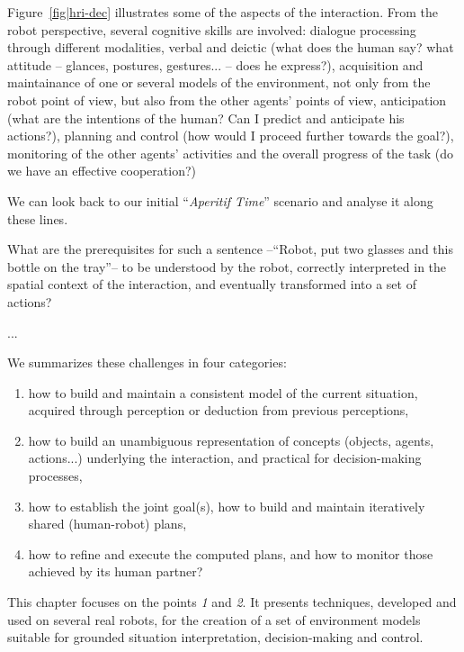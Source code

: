 \documentclass{svmult}
\begin{document}
Figure~\ref{fig|hri-dec} illustrates some of the aspects of the interaction.
From the robot perspective, several cognitive skills are involved: dialogue
processing through different modalities, verbal and deictic (what does the
human say? what attitude -- glances, postures, gestures... -- does he
express?), acquisition and maintainance of one or several models of the
environment, not only from the robot point of view, but also from the other
agents' points of view, anticipation (what are the intentions of the human? Can
I predict and anticipate his actions?), planning and control (how would I
proceed further towards the goal?), monitoring of the other agents' activities
and the overall progress of the task (do we have an effective cooperation?)

We can look back to our initial ``\emph{Aperitif Time}'' scenario and analyse
it along these lines.

What are the prerequisites for such a sentence --``Robot, put two glasses and
this bottle on the tray''-- to be understood by the robot, correctly
interpreted in the spatial context of the interaction, and eventually
transformed into a set of actions?


...

We summarizes these challenges in four categories:

\begin{enumerate}

	\item how to build and maintain a consistent model of the current
	situation, acquired through perception or deduction from previous
	perceptions,

	\item how to build an unambiguous representation of concepts (objects,
	agents, actions...) underlying the interaction, and practical for
	decision-making processes,

	\item how to establish the joint goal(s), how to build and maintain
	iteratively shared (human-robot) plans, 

	\item how to refine and execute the computed plans, and how to monitor
	those achieved by its human partner?

\end{enumerate}


This chapter focuses on the points {\it 1} and {\it 2}. It presents techniques,
developed and used on several real robots, for the creation of a set of
environment models suitable for grounded situation interpretation,
decision-making and control.
\end{document}
